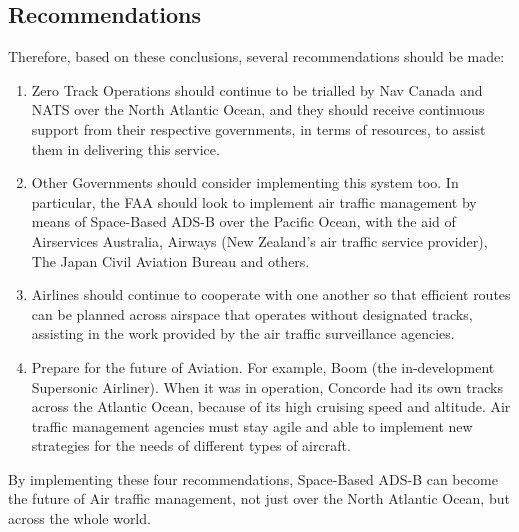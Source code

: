 \documentclass[stu, a4paper, 12pt, floatsintext]{apa7}
\numberwithin{figure}{section}
\numberwithin{table}{section}
\numberwithin{equation}{section}
\begin{document}
\subsection{Recommendations}
Therefore, based on these conclusions, several recommendations should be made:
\begin{enumerate}
    \item Zero Track Operations should continue to be trialled by Nav Canada and NATS over the North Atlantic Ocean, and they should receive continuous support from their respective governments, in terms of resources, to assist them in delivering this service.
    \item Other Governments should consider implementing this system too. In particular, the FAA should look to implement air traffic management by means of Space-Based ADS-B over the Pacific Ocean, with the aid of Airservices Australia, Airways (New Zealand’s air traffic service provider), The Japan Civil Aviation Bureau and others.
    \item Airlines should continue to cooperate with one another so that efficient routes can be planned across airspace that operates without designated tracks, assisting in the work provided by the air traffic surveillance agencies. 
    \item Prepare for the future of Aviation. For example, Boom (the in-development Supersonic Airliner). When it was in operation, Concorde had its own tracks across the Atlantic Ocean, because of its high cruising speed and altitude. Air traffic management agencies must stay agile and able to implement new strategies for the needs of different types of aircraft.  
\end{enumerate}
By implementing these four recommendations, Space-Based ADS-B can become the future of Air traffic management, not just over the North Atlantic Ocean, but across the whole world.

\printbibliography
\newpage
\end{document}
